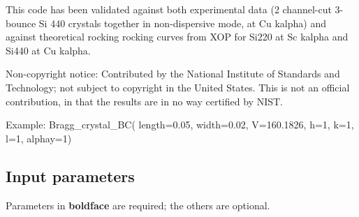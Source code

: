 This code has been validated against both experimental data (2 channel-cut 3-bounce Si 440 crystals together in non-dispersive mode, at Cu kalpha) and against theoretical rocking rocking curves from XOP for Si220 at Sc kalpha and Si440 at Cu kalpha.

Non-copyright notice: Contributed by the National Institute of Standards and Technology; not subject to copyright in the United States. This is not an official contribution, in that the results are in no way certified by NIST.

Example: Bragg\_crystal\_BC( length=0.05, width=0.02, V=160.1826, h=1, k=1, l=1, alphay=1)

\subsection*{Input parameters}
Parameters in \textbf{boldface} are required; the others are optional.

